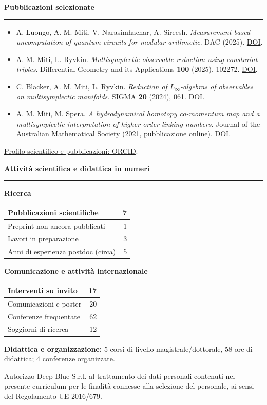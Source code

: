 \documentclass[10pt,a4paper]{article}
\newcommand{\cvsection}[1]{%
    \Needspace{4\baselineskip}%
    \vspace{0.8em}%
    {\large\bfseries\color{accent} #1}\par
    \vspace{0.2em}\hrule\vspace{0.45em}%
}
\begin{document}
\cvsection{Pubblicazioni selezionate}
\begin{itemize}[itemsep=4pt]
    \item A. Luongo, A. M. Miti, V. Narasimhachar, A. Sireesh.
    \emph{Measurement-based uncomputation of quantum circuits for modular arithmetic}.
    DAC (2025).
    \href{https://doi.org/10.1109/DAC63849.2025.11132981}{DOI}.
    \item A. M. Miti, L. Ryvkin.
    \emph{Multisymplectic observable reduction using constraint triples}.
    Differential Geometry and its Applications \textbf{100} (2025), 102272.
    \href{https://doi.org/10.1016/j.difgeo.2025.102272}{DOI}.
    \item C. Blacker, A. M. Miti, L. Ryvkin.
    \emph{Reduction of $L_\infty$-algebras of observables on multisymplectic manifolds}.
    SIGMA \textbf{20} (2024), 061.
    \href{https://doi.org/10.3842/SIGMA.2024.061}{DOI}.
    \item A. M. Miti, M. Spera.
    \emph{A hydrodynamical homotopy co-momentum map and a multisymplectic interpretation of higher-order linking numbers}.
    Journal of the Australian Mathematical Society (2021, pubblicazione online).
    \href{https://doi.org/10.1017/S1446788720000518}{DOI}.
\end{itemize}
\href{https://orcid.org/0000-0002-8829-1943}{Profilo scientifico e pubblicazioni: ORCID}.\par

\cvsection{Attività scientifica e didattica in numeri}
\begin{minipage}[t]{0.48\textwidth}
\textbf{Ricerca}\par\vspace{3pt}
\begin{tabularx}{\linewidth}{|>{\raggedright\arraybackslash}X|r|}
\hline
Pubblicazioni scientifiche & 7 \\ \hline
Preprint non ancora pubblicati & 1 \\ \hline
Lavori in preparazione & 3 \\ \hline
Anni di esperienza postdoc (circa) & 5 \\ \hline
\end{tabularx}
\end{minipage}\hfill
\begin{minipage}[t]{0.48\textwidth}
\textbf{Comunicazione e attività internazionale}\par\vspace{3pt}
\begin{tabularx}{\linewidth}{|>{\raggedright\arraybackslash}X|r|}
\hline
Interventi su invito & 17 \\ \hline
Comunicazioni e poster & 20 \\ \hline
Conferenze frequentate & 62 \\ \hline
Soggiorni di ricerca & 12 \\ \hline
\end{tabularx}
\end{minipage}
\par\vspace{5pt}
\textbf{Didattica e organizzazione:} 5 corsi di livello magistrale/dottorale, 58 ore di didattica; 4 conferenze organizzate.

\vspace{0.5em}
{\footnotesize{Autorizzo Deep Blue S.r.l. al trattamento dei dati personali contenuti nel presente curriculum per le finalità connesse alla selezione del personale, ai sensi del Regolamento UE 2016/679.}}\par
\end{document}

